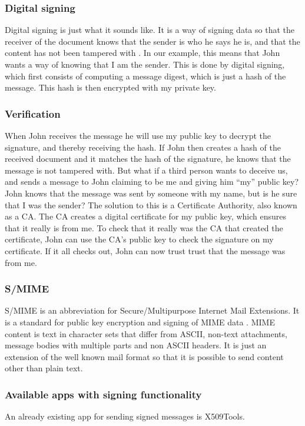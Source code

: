 \subsubsection{Digital signing}
Digital signing is just what it sounds like. It is a way of signing data so that the receiver of the document knows that the sender is who he says he is, and that the content has not been tampered with \cite{bib:ds}. In our example, this means that John wants a way of knowing that I am the sender. This is done by digital signing, which first consists of computing a message digest, which is just a hash of the message. This hash is then encrypted with my private key.


\subsubsection{Verification}
When John receives the message he will use my public key to decrypt the signature, and thereby receiving the hash. If John then creates a hash of the received document and it matches the hash of the signature, he knows that the message is not tampered with. 
\newline
\newline
But what if a third person wants to deceive us, and sends a message to John claiming to be me and giving him “my” public key? John knows that the message was sent by someone with my name, but is he sure that I was the sender? The solution to this is a Certificate Authority, also known as a CA. The CA creates a digital certificate for my public key, which ensures that it really is from me. To check that it really was the CA that created the certificate, John can use the CA's public key to check the signature on my certificate. If it all checks out, John can now trust trust that the message was from me.

\subsubsection{S/MIME}
S/MIME is an abbreviation for Secure/Multipurpose Internet Mail Extensions. It is a standard for public key encryption and signing of MIME data \cite{bib:smime}. MIME content is text in character sets that differ from ASCII, non-text attachments, message bodies with multiple parts and non ASCII headers. It is just an extension of the well known mail format so that it is possible to send content other than plain text.

\subsubsection{Available apps with signing functionality}
An already existing app for sending signed messages is X509Tools.

